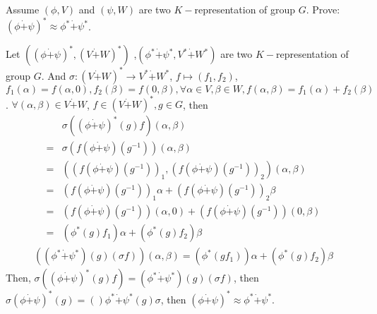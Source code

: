 \documentclass{ctexart}
\begin{document}
\begin{problem}
Assume $(\phi,V)$ and $(\psi,W)$ are two $K-$representation of group $G$.
Prove: $(\phi \dot{+}\psi)^*\approx \phi^*\dot{+}\psi^*$.
\end{problem}
\begin{solution}
    Let $((\phi \dot{+}\psi)^*,(V\dot{+}W)^*)$ ,$(\phi^*\dot{+}\psi^*, V^*\dot{+} W^*)$ are two $K-$representation of group $G$. And $\sigma:(V\dot{+}W)^*\to V^*\dot{+} W^*$, $f\mapsto(f_1,f_2)$, $f_1(\alpha)=f(\alpha,0), f_2(\beta)=f(0,\beta), \forall \alpha\in V, \beta\in W, f(\alpha,\beta)=f_1(\alpha)+f_2(\beta)$. $\forall (\alpha,\beta)\in V\dot{+} W$, $f\in (V\dot{+}W)^*, g\in G$, then 
    \begin{equation}
        \begin{aligned}
            &\sigma((\phi \dot{+}\psi)^*(g) f)(\alpha,\beta)\\
            =&\sigma(f(\phi \dot{+}\psi)(g^{-1}))(\alpha,\beta)\\
            =&((f(\phi \dot{+}\psi)(g^{-1}))_1,(f(\phi \dot{+}\psi)(g^{-1}))_2)(\alpha,\beta)\\
            =&(f(\phi \dot{+}\psi)(g^{-1}))_1 \alpha+(f(\phi \dot{+}\psi)(g^{-1}))_2 \beta\\
            =&(f(\phi \dot{+}\psi)(g^{-1}))(\alpha,0)+(f(\phi \dot{+}\psi)(g^{-1}))(0,\beta)\\
            =&(\phi^*(g)f_1)\alpha+(\phi^*(g)f_2)\beta
        \end{aligned}
    \end{equation} 
    \begin{equation}
        \begin{aligned}
            ((\phi^*\dot{+}\psi^*)(g)(\sigma f))(\alpha,\beta)=(\phi^*(gf_1))\alpha+(\phi^*(g)f_2)\beta
        \end{aligned}
    \end{equation}
    Then, $\sigma((\phi \dot{+}\psi)^*(g) f)=(\phi^*\dot{+}\psi^*)(g)(\sigma f)$, then $\sigma(\phi \dot{+}\psi)^*(g)=()\phi^*\dot{+}\psi^*(g)\sigma$, then $(\phi \dot{+}\psi)^*\approx \phi^*\dot{+}\psi^*$.
\end{solution}\fi
\end{document}
